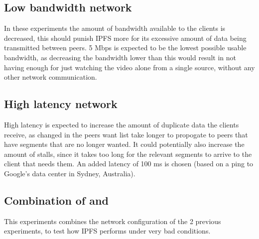 \subsection{Low bandwidth network} %
\label{sec:eval_low_bandwidth}
In these experiments the amount of bandwidth available to the clients is decreased, this should punish \ac{IPFS} more for its excessive amount of data being transmitted between peers. 5 \ac{Mbps} is expected to be the lowest possible usable bandwidth, as decreasing the bandwidth lower than this would result in not having enough for just watching the video alone from a single source, without any other network communication.

\subsection{High latency network} %
\label{sec:eval_high_latency}
High latency is expected to increase the amount of duplicate data the clients receive, as changed in the peers want list take longer to propogate to peers that have segments that are no longer wanted. It could potentially also increase the amount of stalls, since it takes too long for the relevant segments to arrive to the client that needs them. An added latency of 100 \acs{ms} is chosen (based on a ping to Google's data center in Sydney, Australia).

\subsection{Combination of  and }
This experiments combines the network configuration of the 2 previous experiments, to test how \ac{IPFS} performs under very bad conditions.



